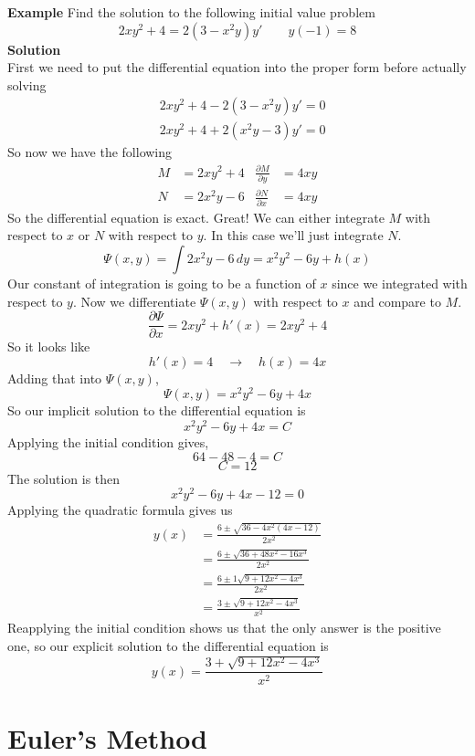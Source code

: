 \documentclass[10pt,reqno]{book}
\theoremstyle{definition}
\begin{document}
	\noindent \textbf{Example} Find the solution to the following initial value problem
	\[ 2xy^2+4 = 2(3-x^2y)y' \qquad y(-1) = 8 \]
	\textbf{Solution}\\
	First we need to put the differential equation into the proper form before actually solving
	\begin{align*}
		&2xy^2 + 4 - 2(3 - x^2y)y' = 0\\
		&2xy^2 + 4 + 2(x^2y - 3)y' = 0
	\end{align*}
	So now we have the following
	\begin{align*}
  		M &= 2xy^2 + 4 & \frac{\partial M}{\partial y} &= 4xy\\
  		N &= 2x^2y - 6 & \frac{\partial N}{\partial x} &= 4xy
	\end{align*}
	So the differential equation is exact. Great! We can either integrate $M$ with respect to $x$ or $N$ with respect to $y$. In this case we'll just integrate $N$.
	$$ \Psi(x,y) = \int 2x^2y - 6\,dy = x^2y^2 - 6y + h(x) $$
	Our constant of integration is going to be a function of $x$ since we integrated with respect to $y$. Now we differentiate $\Psi(x,y)$ with respect to $x$ and compare to $M$.
	$$ \frac{\partial \Psi}{\partial x} = 2xy^2 + h'(x) = 2xy^2 + 4 $$
	So it looks like
	$$ h'(x) = 4 \quad \to \quad h(x) = 4x $$
	Adding that into $\Psi(x,y)$,
	$$ \Psi(x,y) = x^2y^2 -6y + 4x $$
	So our implicit solution to the differential equation is
	$$ x^2y^2 -6y + 4x = C $$
	Applying the initial condition gives,
	$$ 64 - 48 - 4 = C $$
	$$ C = 12 $$
	The solution is then
	$$ x^2y^2 - 6y + 4x - 12 = 0 $$
	Applying the quadratic formula gives us
	\begin{align*}
		y(x) &= \frac{6 \pm \sqrt{36 - 4x^2(4x-12)}}{2x^2}\\
		&= \frac{6 \pm \sqrt{36 + 48x^2 - 16x^3}}{2x^2}\\
		&= \frac{6 \pm 1\sqrt{9 + 12x^2 - 4x^3}}{2x^2}\\
		&= \frac{3 \pm \sqrt{9 + 12x^2 - 4x^3}}{x^2}
	\end{align*}
	Reapplying the initial condition shows us that the only answer is the positive one, so our explicit solution to the differential equation is
	$$  y(x) = \frac{3 + \sqrt{9 + 12x^2 - 4x^3}}{x^2}$$

	\newpage


	\section{Euler's Method}
\end{document}
